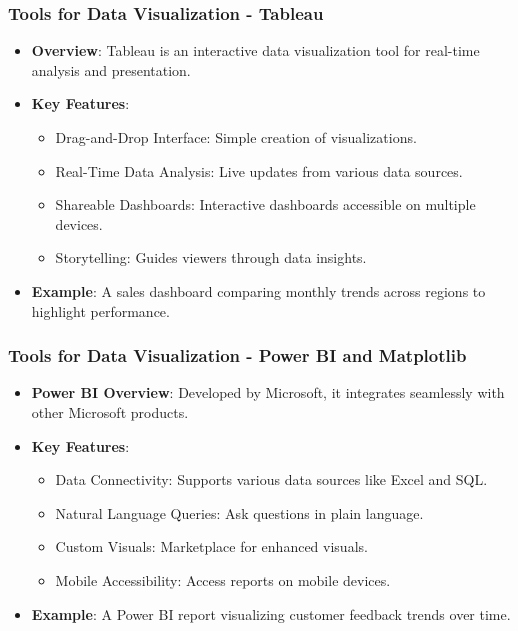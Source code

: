 \documentclass{beamer}
\begin{document}
\begin{frame}[fragile]
    \frametitle{Tools for Data Visualization - Tableau}
    \begin{itemize}
        \item \textbf{Overview}: 
        Tableau is an interactive data visualization tool for real-time analysis and presentation.
        
        \item \textbf{Key Features}:
        \begin{itemize}
            \item Drag-and-Drop Interface: Simple creation of visualizations.
            \item Real-Time Data Analysis: Live updates from various data sources.
            \item Shareable Dashboards: Interactive dashboards accessible on multiple devices.
            \item Storytelling: Guides viewers through data insights.
        \end{itemize}
        
        \item \textbf{Example}: 
        A sales dashboard comparing monthly trends across regions to highlight performance.
    \end{itemize}
\end{frame}

\begin{frame}[fragile]
    \frametitle{Tools for Data Visualization - Power BI and Matplotlib}
    \begin{itemize}
        \item \textbf{Power BI Overview}: 
        Developed by Microsoft, it integrates seamlessly with other Microsoft products.
        
        \item \textbf{Key Features}:
        \begin{itemize}
            \item Data Connectivity: Supports various data sources like Excel and SQL.
            \item Natural Language Queries: Ask questions in plain language.
            \item Custom Visuals: Marketplace for enhanced visuals.
            \item Mobile Accessibility: Access reports on mobile devices.
        \end{itemize}
        
        \item \textbf{Example}: 
        A Power BI report visualizing customer feedback trends over time.
    \end{itemize}
\end{frame}
\end{document}
